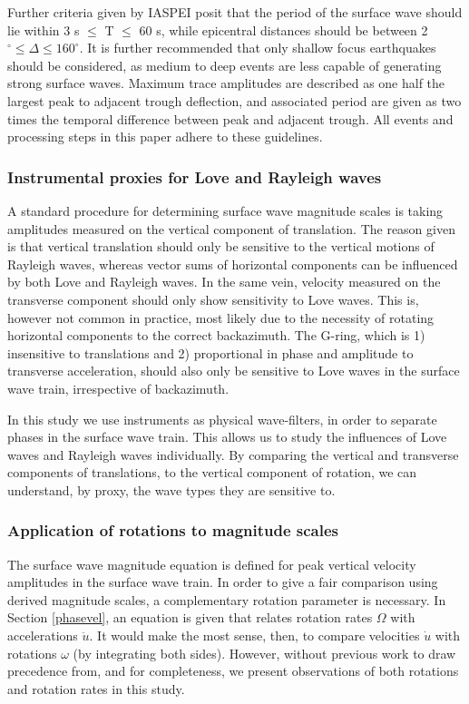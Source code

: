 \documentclass{gji}
\begin{document}
Further criteria given by IASPEI posit that the period of the surface wave should lie within 3 s $\le$ T $\le$ 60 s, while epicentral distances should be between 2$^\circ \le \Delta \le 160^\circ$. It is further recommended that only shallow focus earthquakes should be considered, as medium to deep events are less capable of generating strong surface waves. %
Maximum trace amplitudes are described as one half the largest peak to adjacent trough deflection, and associated period are given as two times the temporal difference between peak and adjacent trough. All events and processing steps in this paper adhere to these guidelines.

\subsubsection{Instrumental proxies for Love and Rayleigh waves}
A standard procedure for determining surface wave magnitude scales is taking amplitudes measured on the vertical component of translation. The reason given is that vertical translation should only be sensitive to the vertical motions of Rayleigh waves, whereas vector sums of horizontal components can be influenced by both Love and Rayleigh waves. In the same vein, velocity measured on the transverse component should only show sensitivity to Love waves. This is, however not common in practice, most likely due to the necessity of rotating horizontal components to the correct backazimuth. The G-ring, which is 1) insensitive to translations and 2) proportional in phase and amplitude to transverse acceleration, should also only be sensitive to Love waves in the surface wave train, irrespective of backazimuth.  

In this study we use instruments as physical wave-filters, in order to separate phases in the surface wave train. This allows us to study the influences of Love waves and Rayleigh waves individually. By comparing the vertical and transverse components of translations, to the vertical component of rotation, we can understand, by proxy, the wave types they are sensitive to.

\subsubsection{Application of rotations to magnitude scales}
The surface wave magnitude equation is defined for peak vertical velocity amplitudes in the surface wave train. In order to give a fair comparison using derived magnitude scales, a complementary rotation parameter is necessary. In Section \ref{phasevel}, an equation is given that relates rotation rates $\Omega$ with accelerations $\ddot{u}$. It would make the most sense, then, to compare velocities $\dot{u}$ with rotations $\omega$ (by integrating both sides). However, without previous work to draw precedence from, and for completeness, we present observations of both rotations and rotation rates in this study.
\end{document}
